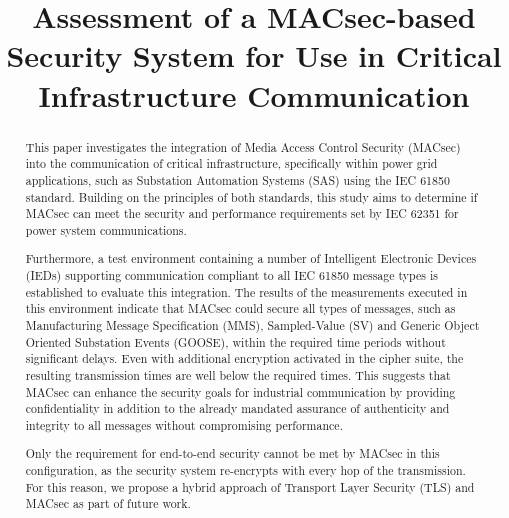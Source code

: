 \documentclass[conference, onecolumn, a4paper]{IEEEtran}
\begin{document}
\title{Assessment of a MACsec-based Security System for Use in Critical Infrastructure Communication}

\author{
    \vspace{6 pt}
}

\maketitle

\begin{abstract}
    \noindent This paper investigates the integration of Media Access Control Security (MACsec) into the communication of critical infrastructure, 
    specifically within power grid applications, such as Substation Automation Systems (SAS) using the IEC 61850 standard. Building on the principles 
    of both standards, this study aims to determine if MACsec can meet the security and performance requirements set by IEC 62351 for power system 
    communications.
    
    \noindent Furthermore, a test environment containing a number of Intelligent Electronic Devices (IEDs) supporting communication compliant to all 
    IEC 61850 message types is established to evaluate this integration. The results of the measurements executed in this environment indicate that 
    MACsec could secure all types of messages, such as Manufacturing Message Specification (MMS), Sampled-Value (SV) and Generic Object Oriented 
    Substation Events (GOOSE), within the required time periods without significant delays. Even with additional encryption activated in the cipher 
    suite, the resulting transmission times are well below the required times. This suggests that MACsec can enhance the security goals for industrial 
    communication by providing confidentiality in addition to the already mandated assurance of authenticity and integrity to all messages without 
    compromising performance.

    \noindent Only the requirement for end-to-end security cannot be met by MACsec in this configuration, as the security system re-encrypts with every 
    hop of the transmission. For this reason, we propose a hybrid approach of Transport Layer Security (TLS) and MACsec as part of future work. 
\end{abstract}
\end{document}
